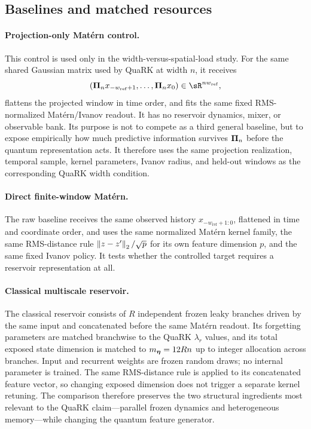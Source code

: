 \subsection{Baselines and matched resources}
\label{app:empirical-baselines}

\paragraph{Projection-only Mat\'ern control.}
This control is used only in the width-versus-spatial-load study.  For the same
shared Gaussian matrix used by QuaRK at width $n$, it receives
\[
    (\projection_n x_{-w_{\mathrm{ref}}+1},\ldots,\projection_n x_0)
    \in\sR^{nw_{\mathrm{ref}}},
\]
flattens the projected window in time order, and fits the same fixed
RMS-normalized Mat\'ern/Ivanov readout.  It has no reservoir dynamics, mixer,
or observable bank.  Its purpose is not to compete as a third general
baseline, but to expose empirically how much predictive information survives
$\bm{\Pi}_n$ before the quantum representation acts.  It therefore uses the
same projection realization, temporal sample, kernel parameters, Ivanov radius,
and held-out windows as the corresponding QuaRK width condition.

\paragraph{Direct finite-window Mat\'ern.}
The raw baseline receives the same observed history $x_{-w_{\mathrm{ref}}+1:0}$,
flattened in time and coordinate order, and uses the same normalized Mat\'ern
kernel family, the same RMS-distance rule $\left\lVert z-z'\right\rVert_2/\sqrt p$ for its own
feature dimension $p$, and the same fixed Ivanov policy.  It tests whether the
controlled target requires a reservoir representation at all.

\paragraph{Classical multiscale reservoir.}
The classical reservoir consists of $R$ independent frozen leaky branches
driven by the same input and concatenated before the same Mat\'ern readout.
Its forgetting parameters are matched branchwise to the QuaRK $\lambda_r$
values, and its total exposed state dimension is matched to
$m_{\bm{\eta}}=12Rn$ up to integer allocation across branches.  Input and recurrent
weights are frozen random draws; no internal parameter is trained.  The
same RMS-distance rule is applied to its concatenated feature vector, so
changing exposed dimension does not trigger a separate kernel retuning.  The
comparison therefore preserves the two structural ingredients most relevant to
the QuaRK claim---parallel frozen dynamics and heterogeneous memory---while
changing the quantum feature generator.

